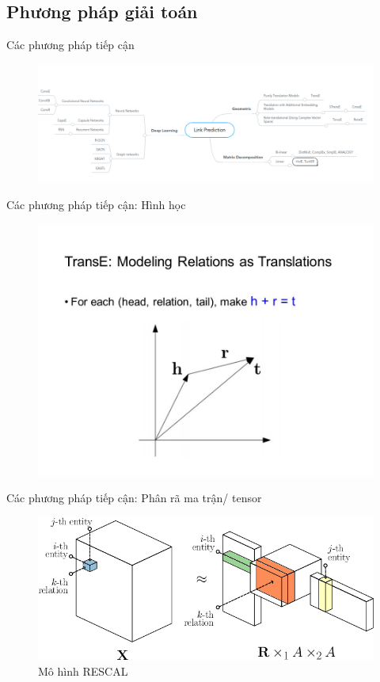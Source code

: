 \documentclass[notheorems, aspectratio=54]{beamer}
\begin{document}
	\subsection{Phương pháp giải toán}
	\begin{frame}{Các phương pháp tiếp cận}
		\begin{figure}[H]
			\includegraphics[width=1\linewidth]{figs/mindmap.png}
			\label{fig:writing-thesis}
		\end{figure}
	\end{frame}
	\begin{frame}{Các phương pháp tiếp cận: Hình học}
		\begin{figure}[H]
			\includegraphics[width=1\linewidth]{figs/TransE.jpg}
			\label{fig:writing-thesis}
		\end{figure}
	\end{frame}
	\begin{frame}{Các phương pháp tiếp cận: Phân rã ma trận/ tensor}
		\begin{figure}[H]
			\includegraphics[width=1\linewidth]{figs/RESCAL.png}
			\caption{Mô hình RESCAL}
			\label{fig:writing-thesis}
		\end{figure}
	\end{frame}
\end{document}
